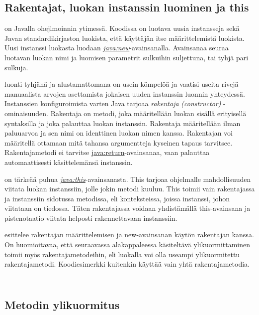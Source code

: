 \documentclass{tufte-book}
\newcommand{\eng}[1]{\textit{(#1)}}
\newcommand{\new}[1]{\textit{\gls{#1}}}
\newcommand{\neweng}[2]{\new{#1} \eng{#2}}
\newcommand{\java}[1]{\underline{\gls{java:#1}}}
\newcommand{\newjava}[1]{\textit{\java{#1}}}
\newcommand{\code}[3]{
\begin{listing}
    \inputminted{java}{OhjelmointiopasEsimerkit/src/#1/#2.java}
    \caption{#3}
    \label{Java-#1-#2}
\end{listing}
}
\begin{document}
\subsection{Rakentajat, luokan instanssin luominen ja this}
\label{new this}

 on Javalla ohejlmoinnin ytimessä. Koodissa on luotava uusia
instansseja sekä Javan standardikirjaston luokista, että käyttäjän itse määrittelemistä luokista.
Uusi instanssi luokasta luodaan \newjava{new}-avainsanalla. Avainsanaa seuraa luotavan luokan
nimi ja luomisen parametrit sulkuihin suljettuna, tai tyhjä pari sulkuja.

 luonti tyhjänä ja alustamattomana on usein kömpelöä ja vaatisi
useita rivejä manuaalista arvojen asettamista jokaisen uuden instanssin luonnin yhteydessä.
Instanssien konfiguroimista varten Java tarjoaa \neweng{rakentaja}{constructor} -ominaisuuden.
Rakentaja on metodi, joka määritellään luokan sisällä erityisellä syntaksilla ja joka palauttaa
luokan instanssin. Rakentaja määritellään ilman paluuarvoa ja sen nimi on identtinen luokan nimen
kanssa. Rakentajan voi määritellä ottamaan mitä tahansa argumentteja kyseinen tapaus tarvitsee.
Rakentajametodi ei tarvitse \java{return}-avainsanaa, vaan palauttaa automaattisesti
käsittelemänsä instanssin.

 on tärkeää puhua \newjava{this}-avainsanasta. This tarjoaa
ohjelmalle mahdollisuuden viitata luokan instanssiin, jolle jokin metodi kuuluu. This toimii
vain rakentajassa ja instanssiin sidotussa metodissa, eli konteksteissa, joissa instanssi, johon
viitataan on tiedossa. Täten rakentajassa voidaan yhdistämällä this-avainsana ja pistenotaatio
viitata helposti rakennettavaan instanssiin.

 esittelee rakentajan määrittelemisen ja new-avainsanan
käytön rakentajan kanssa. On huomioitavaa, että seuraavassa alakappaleessa käsiteltävä
ylikuormittaminen toimii myös rakentajametodeihin, eli luokalla voi olla useampi ylikuormitettu
rakentajametodi. Koodiesimerkki kuitenkin käyttää vain yhtä rakentajametodia.

\code{week2}{BasicConstructorChild}{Rakentajan luonti Javassa}
\code{week2}{BasicConstructor}{\java{new}-avainsanan käyttö}


\subsection{Metodin ylikuormitus}
\label{overloading}
\end{document}
